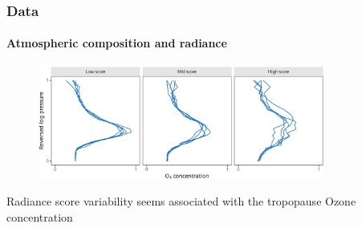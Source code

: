 \documentclass{snedecorbeamer}
\begin{document}
\begin{frame}[c]
  \frametitle{Data}
  \framesubtitle{Atmospheric composition and radiance}

  \begin{figure}
    \centering
    \includegraphics[height=10em]{inc/mls_input_profiles}
  \end{figure}

  \begin{center}
    Radiance score variability seems associated with the tropopause Ozone
    concentration
  \end{center}

\end{frame}
\end{document}
